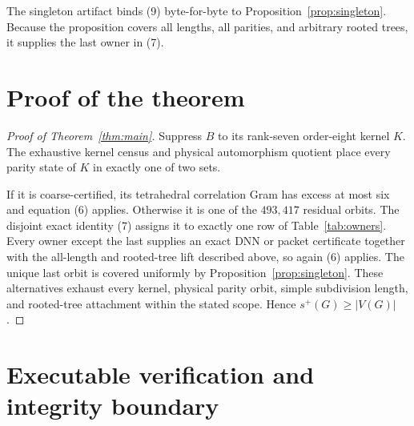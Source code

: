 \documentclass[11pt]{article}
\theoremstyle{remark}
\newcommand{\splus}{s^+}
\begin{document}
The singleton artifact binds (9) byte-for-byte to
Proposition~\ref{prop:singleton}.  Because the proposition covers all lengths,
all parities, and arbitrary rooted trees, it supplies the last owner in (7).

\section{Proof of the theorem}

\begin{proof}[Proof of Theorem~\ref{thm:main}]
Suppress $B$ to its rank-seven order-eight kernel $K$.  The exhaustive kernel
census and physical automorphism quotient place every parity state of $K$ in
exactly one of two sets.

If it is coarse-certified, its tetrahedral correlation Gram has excess at most
six and equation (6) applies.  Otherwise it is one of the $493{,}417$ residual
orbits.  The disjoint exact identity (7) assigns it to exactly one row of
Table~\ref{tab:owners}.  Every owner except the last supplies an exact DNN or
packet certificate together with the all-length and rooted-tree lift described
above, so again (6) applies.  The unique last orbit is covered uniformly by
Proposition~\ref{prop:singleton}.  These alternatives exhaust every kernel,
physical parity orbit, simple subdivision length, and rooted-tree attachment
within the stated scope.  Hence $\splus(G)\geq|V(G)|$.
\end{proof}

\section{Executable verification and integrity boundary}
\end{document}
